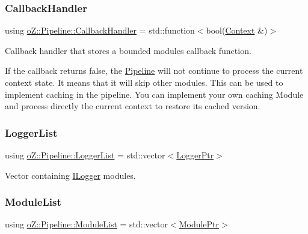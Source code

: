 \subsubsection{\texorpdfstring{CallbackHandler}{CallbackHandler}}
{\footnotesize\ttfamily using \mbox{\hyperlink{classo_z_1_1_pipeline_a5a71ea2f2d4be5b82589c1b8175722f4}{o\+Z\+::\+Pipeline\+::\+Callback\+Handler}} =  std\+::function$<$bool(\mbox{\hyperlink{classo_z_1_1_context}{Context}} \&)$>$}



Callback handler that stores a bounded module\textquotesingle{}s callback function. 

If the callback returns false, the \mbox{\hyperlink{classo_z_1_1_pipeline}{Pipeline}} will not continue to process the current context state. It means that it will skip other modules. This can be used to implement caching in the pipeline. You can implement your own caching Module and process directly the current context to restore its cached version. \mbox{\label{classo_z_1_1_pipeline_aa1f26badb603f054e554e3ddf8b846b0}} 
\subsubsection{\texorpdfstring{LoggerList}{LoggerList}}
{\footnotesize\ttfamily using \mbox{\hyperlink{classo_z_1_1_pipeline_aa1f26badb603f054e554e3ddf8b846b0}{o\+Z\+::\+Pipeline\+::\+Logger\+List}} =  std\+::vector$<$\mbox{\hyperlink{namespaceo_z_aaa2fbabbfafc6616a7e69651b62a3d4e}{Logger\+Ptr}}$>$}



Vector containing \mbox{\hyperlink{classo_z_1_1_i_logger}{I\+Logger}} modules. 

\mbox{\label{classo_z_1_1_pipeline_a3bb478d291a83763b269d8d27e186a47}} 
\subsubsection{\texorpdfstring{ModuleList}{ModuleList}}
{\footnotesize\ttfamily using \mbox{\hyperlink{classo_z_1_1_pipeline_a3bb478d291a83763b269d8d27e186a47}{o\+Z\+::\+Pipeline\+::\+Module\+List}} =  std\+::vector$<$\mbox{\hyperlink{namespaceo_z_af5a56aaaee027504979038f38991adcf}{Module\+Ptr}}$>$}



